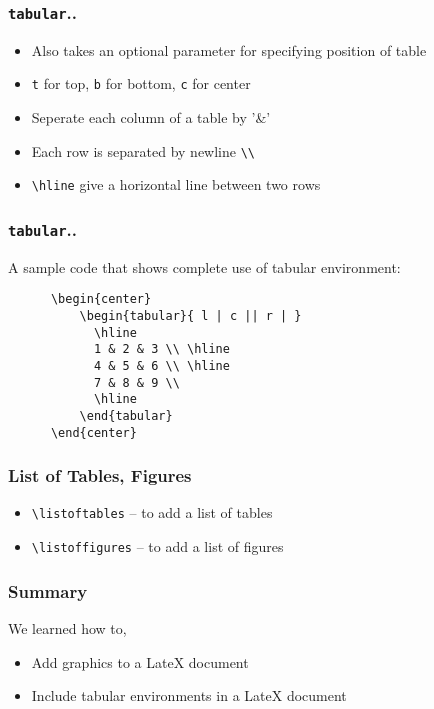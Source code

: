 \documentclass[17pt,compress]{beamer}
\begin{document}
\begin{frame}[fragile]
  \frametitle{\lstinline+tabular+..}
\begin{itemize}
  \item Also takes an optional parameter for specifying position of
    table 
  \item \lstinline+t+ for top, \lstinline+b+ for bottom, \lstinline+c+
    for center 
  \item Seperate each column of a table by '\&'
  \item Each row is separated by newline \lstinline{\\}
  \item \lstinline+\hline+ give a horizontal line between two rows
  \end{itemize}
\end{frame}


\begin{frame}[fragile]
  \frametitle{\lstinline+tabular+..}
  A sample code that shows complete use of tabular environment:
  \vspace{8pt}
  {\tiny
    \begin{verbatim}
      \begin{center}
          \begin{tabular}{ l | c || r | }
            \hline
            1 & 2 & 3 \\ \hline
            4 & 5 & 6 \\ \hline
            7 & 8 & 9 \\
            \hline
          \end{tabular}
      \end{center}
    \end{verbatim}
  }
\end{frame}  

\begin{frame}[fragile]
  \frametitle{List of Tables, Figures}
  \begin{itemize}
  \item \lstinline+\listoftables+ -- to add a list of tables
  \item \lstinline+\listoffigures+ -- to add a list of figures
  \end{itemize}
\end{frame}

\begin{frame}[fragile]
	\frametitle{Summary}
    We learned how to,
	\begin{itemize}
	\item Add graphics to a LateX document
	\item Include tabular environments in a LateX document
	\end{itemize}
\end{frame}
\end{document}
